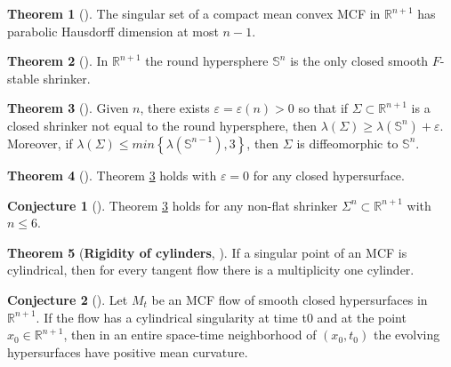 \documentclass{amsart}
\theoremstyle{definition}
\newtheorem{Thm}{Theorem}[section]
\newtheorem{Con}{Conjecture}[section]
\begin{document}
\begin{Thm}[\cite{White 2000}]
The singular set of a compact mean convex MCF in ${\mathbb{R}}^{n+1}$ has parabolic Hausdorff dimension at most $n-1$.
\end{Thm}

\begin{Thm}[\cite{Colding Minicozzi 2012}]
In ${\mathbb{R}}^{n+1}$ the round hypersphere ${\mathbb{S}}^{n}$ is the only closed smooth $F$-stable shrinker.
\end{Thm}

\begin{Thm}[\cite{Colding Ilmanen Minicozzi White 2013}] \label{Colding Ilmanen Minicozzi White 2013}
Given $n$, there exists  $\varepsilon = \varepsilon(n) > 0$ so that if $\Sigma \subset {\mathbb{R}}^{n+1}$
is a closed shrinker not equal to the round hypersphere, then $\lambda\left(\Sigma\right) \geq \lambda\left({\mathbb{S}}^{n}\right) + \varepsilon$. Moreover,
if $\lambda\left(\Sigma\right) \leq min \left\{  \lambda \left({\mathbb{S}}^{n-1}\right) , 3 \right\}$, then $\Sigma$ is diffeomorphic to ${\mathbb{S}}^{n}$.
\end{Thm}
 
 \begin{Thm}[\cite{Bernstein Wang 2016}]
Theorem \ref{Colding Ilmanen Minicozzi White 2013} holds  with $\varepsilon = 0$ for any closed hypersurface.
\end{Thm}

\begin{Con}[\cite{Colding Minicozzi Pedersen 2015}] Theorem \ref{Colding Ilmanen Minicozzi White 2013} holds for any 
non-flat shrinker ${\Sigma}^{n}  \subset {\mathbb{R}}^{n+1}$ with $n \leq 6$.
\end{Con}

\begin{Thm}[\textbf{Rigidity of cylinders}, \cite{Colding Ilmanen Minicozzi 2015}]
If a singular point of an MCF is cylindrical, then for every tangent flow there is a multiplicity one cylinder. 
\end{Thm}

\begin{Con}[\cite{Colding Minicozzi Pedersen 2015}] Let ${M}_{t}$  be an MCF flow of smooth closed hypersurfaces in 
${\mathbb{R}}^{n+1}$. If the flow has a cylindrical singularity at time t0 and at the point $x_0 \in {\mathbb{R}}^{n+1}$, then in an 
entire space-time neighborhood of $\left(x_0,t_0\right)$ the evolving hypersurfaces have positive mean curvature.
\end{Con}
\end{document}

